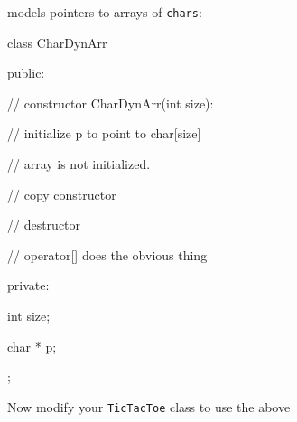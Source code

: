 models pointers to arrays of \texttt{chars}:



\begin{console}

class CharDynArr

{

public:

        // constructor CharDynArr(int size):

        // initialize p to point to char[size]

        // array is not initialized.



        // copy constructor



        // destructor



        // operator[] does the obvious thing



private:

        int size;

        char * p;

};

\end{console}



Now modify your \texttt{TicTacToe} class to use the above




